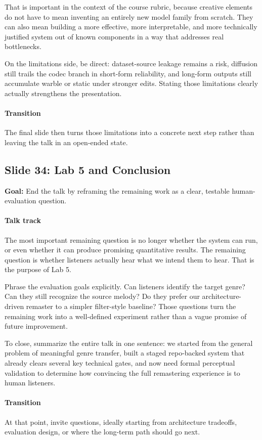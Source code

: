 \documentclass[11pt]{article}
\begin{document}
That is important in the context of the course rubric, because creative elements do not have to mean inventing an entirely new model family from scratch. They can also mean building a more effective, more interpretable, and more technically justified system out of known components in a way that addresses real bottlenecks.

On the limitations side, be direct: dataset-source leakage remains a risk, diffusion still trails the codec branch in short-form reliability, and long-form outputs still accumulate warble or static under stronger edits. Stating those limitations clearly actually strengthens the presentation.

\paragraph{Transition}
The final slide then turns those limitations into a concrete next step rather than leaving the talk in an open-ended state.

\subsection*{Slide 34: Lab 5 and Conclusion}
\textbf{Goal:} End the talk by reframing the remaining work as a clear, testable human-evaluation question.
\paragraph{Talk track}
The most important remaining question is no longer whether the system can run, or even whether it can produce promising quantitative results. The remaining question is whether listeners actually hear what we intend them to hear. That is the purpose of Lab 5.

Phrase the evaluation goals explicitly. Can listeners identify the target genre? Can they still recognize the source melody? Do they prefer our architecture-driven remaster to a simpler filter-style baseline? Those questions turn the remaining work into a well-defined experiment rather than a vague promise of future improvement.

To close, summarize the entire talk in one sentence: we started from the general problem of meaningful genre transfer, built a staged repo-backed system that already clears several key technical gates, and now need formal perceptual validation to determine how convincing the full remastering experience is to human listeners.

\paragraph{Transition}
At that point, invite questions, ideally starting from architecture tradeoffs, evaluation design, or where the long-term path should go next.
\end{document}
